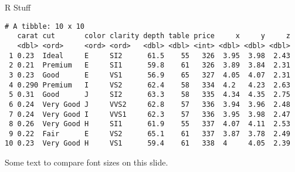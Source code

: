 \documentclass[10pt,ignorenonframetext,,aspectratio=149]{beamer}
\newenvironment{Shaded}{\begin{snugshade}}{\end{snugshade}}
\newcommand{\DataTypeTok}[1]{\textcolor[rgb]{0.13,0.29,0.53}{#1}}
\newcommand{\DecValTok}[1]{\textcolor[rgb]{0.00,0.00,0.81}{#1}}
\newcommand{\KeywordTok}[1]{\textcolor[rgb]{0.13,0.29,0.53}{\textbf{#1}}}
\newcommand{\NormalTok}[1]{#1}
\newcommand{\OperatorTok}[1]{\textcolor[rgb]{0.81,0.36,0.00}{\textbf{#1}}}
\newcommand{\StringTok}[1]{\textcolor[rgb]{0.31,0.60,0.02}{#1}}
\begin{document}
\begin{frame}{R Stuff}
\protect\hypertarget{r-stuff}{}
\begin{verbatim}
# A tibble: 10 x 10
   carat cut       color clarity depth table price     x     y     z
   <dbl> <ord>     <ord> <ord>   <dbl> <dbl> <int> <dbl> <dbl> <dbl>
 1 0.23  Ideal     E     SI2      61.5    55   326  3.95  3.98  2.43
 2 0.21  Premium   E     SI1      59.8    61   326  3.89  3.84  2.31
 3 0.23  Good      E     VS1      56.9    65   327  4.05  4.07  2.31
 4 0.290 Premium   I     VS2      62.4    58   334  4.2   4.23  2.63
 5 0.31  Good      J     SI2      63.3    58   335  4.34  4.35  2.75
 6 0.24  Very Good J     VVS2     62.8    57   336  3.94  3.96  2.48
 7 0.24  Very Good I     VVS1     62.3    57   336  3.95  3.98  2.47
 8 0.26  Very Good H     SI1      61.9    55   337  4.07  4.11  2.53
 9 0.22  Fair      E     VS2      65.1    61   337  3.87  3.78  2.49
10 0.23  Very Good H     VS1      59.4    61   338  4     4.05  2.39
\end{verbatim}

Some text to compare font sizes on this slide.

\begin{Shaded}
\end{Shaded}


\end{frame}
\end{document}
